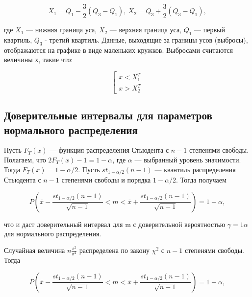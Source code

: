 \documentclass[12pt,a4paper]{article}
\begin{document}
	\begin{equation} \label{eq:box_plot}
		X_1 = Q_1 - \frac{3}{2}(Q_3 - Q_1), \ X_2 = Q_3 + \frac{3}{2}(Q_3 - Q_1),
	\end{equation}

	где $X_1$ — нижняя граница уса, $X_2$ — верхняя граница уса, $Q_1$ — первый квартиль, $Q_3$ - третий квартиль.
	Данные, выходящие за границы усов (выбросы), отображаются на графике в виде маленьких кружков.
	Выбросами считаются величины $х$, такие что:

	\begin{equation} \label{eq:outlier}
		\left[
			\begin{array}{ll}
					x < X_1^T \\
					x > X_2^T
			\end{array}
		\right .
	\end{equation}

	\subsection{Доверительные интервалы для параметров нормального распределения}

	Пусть $F_T(x)$ — функция распределения Стьюдента с $n - 1$ степенями свободы. Полагаем, что $2F_T(x) - 1 = 1 - \alpha$, где $\alpha$ — выбранный уровень значимости. Тогда $F_T(x) = 1 - \alpha / 2$. Пусть $st_{1 - \alpha / 2}(n - 1)$ — квантиль распределения Стьюдента с $n - 1$ степенями свободы и порядка $1 - \alpha / 2$. Тогда получаем

	\begin{equation} \label{eq:normal_mean_boundaries}
		P \left ( \overline x - \frac{st_{1 - \alpha / 2}(n - 1)}{\sqrt{n - 1}} < m < \overline x + \frac{st_{1 - \alpha / 2}(n - 1)}{\sqrt{n - 1}} \right ) = 1 - \alpha,
	\end{equation}

	что и даст доверительный интервал для m с доверительной вероятностью $\gamma = 1 \alpha$ для нормального распределения.

	Случайная величина $n \frac{s^2}{\sigma^2}$ распределена по закону $\chi^2$ с $n - 1$ степенями свободы. Тогда

	\begin{equation} \label{eq:mean_boundaries}
		P \left ( \overline x - \frac{st_{1 - \alpha / 2}(n - 1)}{\sqrt{n - 1}} < m < \overline x + \frac{st_{1 - \alpha / 2}(n - 1)}{\sqrt{n - 1}} \right ) = 1 - \alpha,
	\end{equation}
\end{document}
